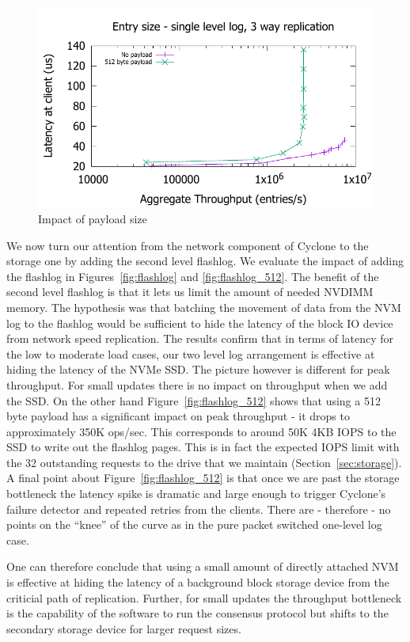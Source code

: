 \documentclass[pageno]{jpaper}
\begin{document}
\begin{figure}
\includegraphics[scale=0.6]{results2/512.pdf}
\caption{Impact of payload size}
\label{fig:payload}
\end{figure}

We now turn our attention from the network component of Cyclone to the storage
one by adding the second level flashlog. We evaluate the impact of adding the
flashlog in Figures~\ref{fig:flashlog} and \ref{fig:flashlog_512}. The benefit
of the second level flashlog is that it lets us limit the amount of needed
NVDIMM memory. The hypothesis was that batching the movement of data from the
NVM log to the flashlog would be sufficient to hide the latency of the block IO
device from network speed replication. The results confirm that in terms of
latency for the low to moderate load cases, our two level log arrangement is
effective at hiding the latency of the NVMe SSD. The picture however is
different for peak throughput. For small updates there is no impact on
throughput when we add the SSD. On the other hand 
Figure~\ref{fig:flashlog_512} shows that using a 512 byte payload has a
significant impact on peak throughput - it drops to approximately 350K
ops/sec. This corresponds to around 50K 4KB IOPS to the SSD to write out the
flashlog pages. This is in fact the expected IOPS limit with the 32 outstanding
requests to the drive that we maintain (Section~\ref{sec:storage}).
A final point about Figure~\ref{fig:flashlog_512} is that once we are past the
storage bottleneck the latency spike is dramatic and large enough to trigger
Cyclone's failure detector and repeated retries from the clients. There are -
therefore - no points on the ``knee'' of the curve as in the pure packet
switched one-level log case.

One can therefore conclude that using a small amount of directly attached NVM is
effective at hiding the latency of a background block storage device from the
criticial path of replication. Further, for small updates the throughput
bottleneck is the capability of the software to run the consensus protocol but
shifts to the secondary storage device for larger request sizes.
\end{document}
